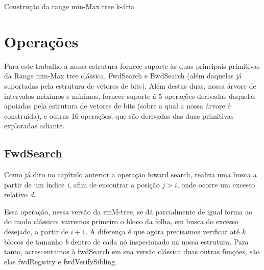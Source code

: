 \begin{algorithm}[htp]
{{{                
            }

        }
    } 
    \caption{Construção da range min-Max tree k-ária}
    \label{alg:build-kary-rmm-tree}
\end{algorithm} 


\section{Operações}\label{sec:optimized-operation}
Para este trabalho a nossa estrutura fornece suporte às duas principais primitivas da Range min-Max tree clássica, FwdSearch e BwdSearch (além daquelas já suportadas pela estrutura de vetores de bits). Além destas duas, nossa árvore de intervalos máximos e mínimos, fornece suporte à 5 operações derivadas daquelas apoiadas pela estrutura de vetores de bits (sobre a qual a nossa árvore é construída), e outras 16 operações, que são derivadas das duas primitivas exploradas adiante.


\subsection{FwdSearch}\label{sec:fwdSearch}
Como já dito no capítulo anterior a operação foward search, realiza uma busca a partir de um índice \textit{i}, afim de encontrar a posição $j>i$, onde ocorre um excesso relativo \textit{d}.

Essa operação, nessa versão da rmM-tree, se dá parcialmente de igual forma ao do modo clássico: varremos primeiro o bloco da folha, em busca do excesso desejado, a partir de $i+1$.  A diferença é que agora precisamos verificar  até \textit{k} blocos de tamanho \textit{b} dentro de cada nó inspecionado na nossa estrutura. Para tanto, acrescentamos à fwdSearch em sua versão clássica duas outras funções, são elas fwdRegistry e fwdVerifySibling.

